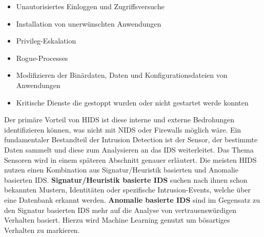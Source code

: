 \begin{itemize}
  \item Unautorisiertes Einloggen und Zugriffsversuche\bigbreak
  \item Installation von unerwünschten Anwendungen\bigbreak
  \item Privileg-Eskalation\bigbreak
  \item Rogue-Processes\bigbreak
  \item Modifizieren der Binärdaten, Daten und Konfigurationsdateien von Anwendungen\bigbreak
  \item Kritische Dienste die gestoppt wurden oder nicht gestartet werde konnten\bigbreak
\end{itemize}
Der primäre Vorteil von HIDS ist diese interne und externe Bedrohungen identifizieren können, was nicht mit NIDS oder Firewalls möglich wäre.
Ein fundamentaler Bestandteil der Intrusion Detection ist der Sensor, der bestimmte Daten sammelt und diese zum Analysieren an das IDS weiterleitet. Das Thema Sensoren wird in einem späteren Abschnitt genauer erläutert.
Die meisten HIDS nutzen einen Kombination aus Signatur/Heuristik basierten und Anomalie basierten IDS.\cite{hids_url_1}
\textbf{Signatur/Heuristik basierte IDS} suchen nach ihnen schon bekannten Mustern, Identitäten oder spezifische Intrusion-Events, welche über eine Datenbank erkannt werden.\cite{hids_url_1}
\textbf{Anomalie basierte IDS} sind im Gegensatz zu den Signatur basierten IDS mehr auf die Analyse von vertrauenswürdigen Verhalten basiert. Hierzu wird Machine Learning genutzt um bösartiges Verhalten zu markieren.\cite{hids_url_1}


